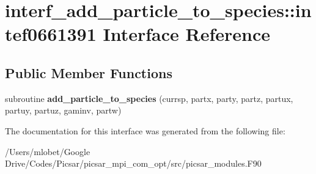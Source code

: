 \hypertarget{interfaceinterf__add__particle__to__species_1_1intef0661391}{}\section{interf\+\_\+add\+\_\+particle\+\_\+to\+\_\+species\+:\+:intef0661391 Interface Reference}
\label{interfaceinterf__add__particle__to__species_1_1intef0661391}
\subsection*{Public Member Functions}
\begin{DoxyCompactItemize}
\item 
subroutine {\bfseries add\+\_\+particle\+\_\+to\+\_\+species} (currsp, partx, party, partz, partux, partuy, partuz, gaminv, partw)\hypertarget{interfaceinterf__add__particle__to__species_1_1intef0661391_af47d27abb9540822ab2feb89d6c76688}{}\label{interfaceinterf__add__particle__to__species_1_1intef0661391_af47d27abb9540822ab2feb89d6c76688}

\end{DoxyCompactItemize}


The documentation for this interface was generated from the following file\+:\begin{DoxyCompactItemize}
\item 
/\+Users/mlobet/\+Google Drive/\+Codes/\+Picsar/picsar\+\_\+mpi\+\_\+com\+\_\+opt/src/picsar\+\_\+modules.\+F90\end{DoxyCompactItemize}
